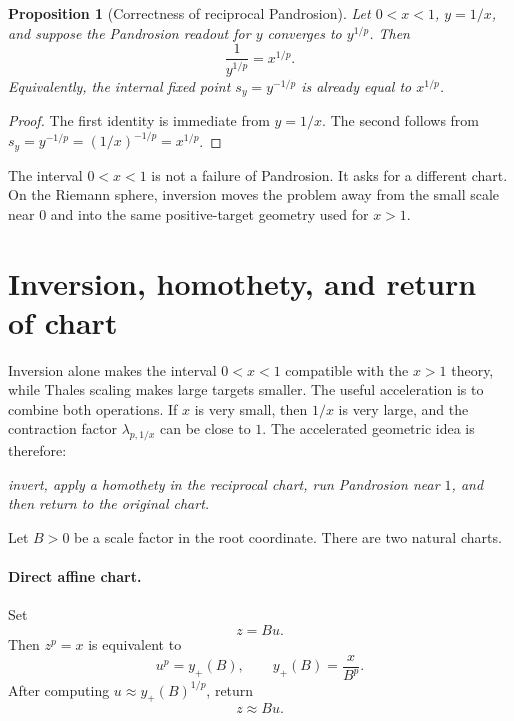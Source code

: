 \documentclass[10pt,a4paper]{article}
\theoremstyle{plain}
\newtheorem{proposition}[theorem]{Proposition}
\theoremstyle{definition}
\theoremstyle{remark}
\newenvironment{takeaway}{%
  \begin{center}\begin{minipage}{0.92\linewidth}\small\itshape\color{blue!45!black}%
}{%
  \end{minipage}\end{center}%
}
\begin{document}
\begin{proposition}[Correctness of reciprocal Pandrosion]
Let $0<x<1$, $y=1/x$, and suppose the Pandrosion readout for $y$ converges to
$y^{1/p}$.  Then
\[
  \frac{1}{y^{1/p}}=x^{1/p}.
\]
Equivalently, the internal fixed point $s_y=y^{-1/p}$ is already equal to
$x^{1/p}$.
\end{proposition}

\begin{proof}
The first identity is immediate from $y=1/x$.  The second follows from
$s_y=y^{-1/p}=(1/x)^{-1/p}=x^{1/p}$.
\end{proof}

\begin{takeaway}
The interval $0<x<1$ is not a failure of Pandrosion.  It asks for a different
chart.  On the Riemann sphere, inversion moves the problem away from the small
scale near $0$ and into the same positive-target geometry used for $x>1$.
\end{takeaway}

\section{Inversion, homothety, and return of chart}
\label{sec:riemann-chart-scaling}

Inversion alone makes the interval $0<x<1$ compatible with the $x>1$ theory,
while Thales scaling makes large targets smaller.  The useful acceleration is to
combine both operations.  If $x$ is very small, then $1/x$ is very large, and the
contraction factor
$\lambda_{p,1/x}$ can be close to $1$.  The accelerated geometric idea is
therefore:

\begin{center}
\emph{invert, apply a homothety in the reciprocal chart, run Pandrosion near
$1$, and then return to the original chart.}
\end{center}

Let $B>0$ be a scale factor in the root coordinate.  There are two natural
charts.

\paragraph{Direct affine chart.}
Set
\[
  z=B u.
\]
Then $z^p=x$ is equivalent to
\begin{equation}
  u^p=y_+(B),
  \qquad
  y_+(B)=\frac{x}{B^p}.
  \label{eq:direct-chart-target}
\end{equation}
After computing $u\approx y_+(B)^{1/p}$, return
\[
  z\approx B u.
\]
\end{document}
